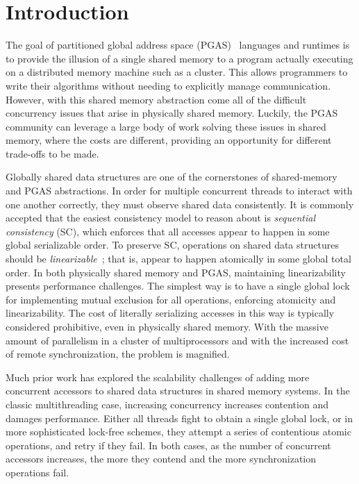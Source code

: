 \section{Introduction}
The goal of partitioned global address space (PGAS)~\cite{upc:2005} languages and runtimes is to provide the illusion of a single shared memory to a program actually executing on a distributed memory machine such as a cluster. This allows programmers to write their algorithms without needing to explicitly manage communication. 
However, with this shared memory abstraction come all of the difficult concurrency issues that arise in physically shared memory. Luckily, the PGAS community can leverage a large body of work solving these issues in shared memory, where the costs are different, providing an opportunity for different trade-offs to be made.

Globally shared data structures are one of the cornerstones of shared-memory and PGAS abstractions. 
In order for multiple concurrent threads to interact with one another correctly, they must observe shared data consistently. It is commonly accepted that the easiest consistency model to reason about is \emph{sequential consistency} (SC), which enforces that all accesses appear to happen in some global serializable order.
To preserve SC, operations on shared data structures should be \emph{linearizable}~\cite{herlihy1990linearizability}; that is, appear to happen atomically in some global total order.
In both physically shared memory and PGAS, maintaining linearizability presents performance challenges.
The simplest way is to have a single global lock for implementing mutual exclusion for all operations, enforcing atomicity and linearizability. The cost of literally serializing accesses in this way is typically considered prohibitive, even in physically shared memory.
With the massive amount of parallelism in a cluster of multiprocessors and with the increased cost of remote synchronization, the problem is magnified.

Much prior work has explored the scalability challenges of adding more concurrent accessors to shared data structures in shared memory systems.
In the classic multithreading case, increasing concurrency increases contention and damages performance.
Either all threads fight to obtain a single global lock, or in more sophisticated lock-free schemes, they attempt a series of contentious atomic operations, and retry if they fail. In both cases, as the number of concurrent accessors increases, the more they contend and the more synchronization operations fail.

